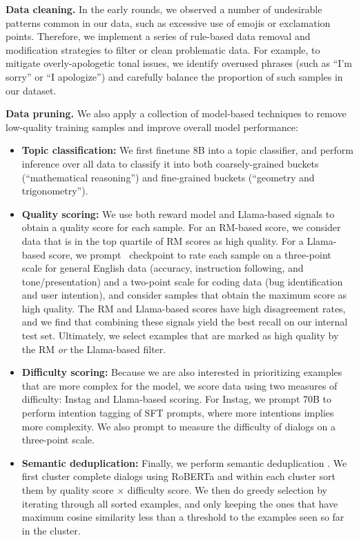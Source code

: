 \textbf{Data cleaning.} In the early rounds, we observed a number of undesirable patterns common in our data, such as excessive use of emojis or exclamation points. Therefore, we implement a series of rule-based data removal and modification strategies to filter or clean problematic data. For example, to mitigate overly-apologetic tonal issues, we identify overused phrases (such as ``I'm sorry'' or ``I apologize'') and carefully balance the proportion of such samples in our dataset. 


\textbf{Data pruning.} 
We also apply a collection of model-based techniques to remove low-quality training samples and improve overall model performance:

\begin{itemize}
    \item \textbf{Topic classification:} We first finetune \llamathree 8B into a topic classifier, and perform inference over all data to classify it into both coarsely-grained buckets (``mathematical reasoning'') and fine-grained buckets (``geometry and trigonometry''). 

    \item \textbf{Quality scoring:} We use both reward model and Llama-based signals to obtain a quality score for each sample. 
    For an RM-based score, we consider data that is in the top quartile of RM scores as high quality.
    For a Llama-based score, we prompt \llamathree~checkpoint to rate each sample on a three-point scale for general English data (accuracy, instruction following, and tone/presentation) and a two-point scale for coding data (bug identification and user intention), and consider samples that obtain the maximum score as high quality. 
    The RM and Llama-based scores have high disagreement rates, and we find that combining these signals yield the best recall on our internal test set. Ultimately, we select examples that are marked as high quality by the RM \emph{or} the Llama-based filter. 

    \item \textbf{Difficulty scoring:} 
    Because we are also interested in prioritizing examples that are more complex for the model, we score data using two measures of difficulty: Instag \citep{lu2023instag} and Llama-based scoring. For Instag, we prompt \llamathree 70B to perform intention tagging of SFT prompts, where more intentions implies more complexity. We also prompt \llamathree to measure the difficulty \citep{liu2024makesgooddataalignment} of dialogs on a three-point scale. 

    \item \textbf{Semantic deduplication:} Finally, we perform semantic deduplication \citep{abbas2023semdedup, liu2024makesgooddataalignment}. We first cluster complete dialogs using RoBERTa \citep{liu_ott_roberta} and within each cluster sort them by quality score $\times$ difficulty score. We then do greedy selection by iterating through all sorted examples, and only keeping the ones that have maximum cosine similarity less than a threshold to the examples seen so far in the cluster.

\end{itemize}


